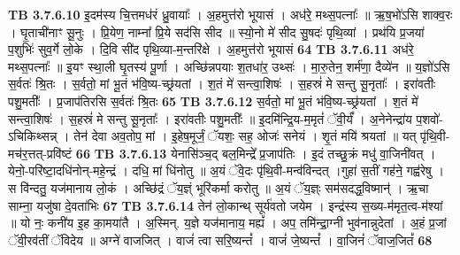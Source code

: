 \documentclass[17pt]{extarticle}
\begin{document}
{{{{{{{{{{{{{{{{{{{                  \newline
                                \textbf{ TB 3.7.6.10} \newline
                  इ॒दम॑स्य चि॒त्तमध॑रं ध्रु॒वायाः᳚ । अ॒हमुत्त॑रो भूयासं । अध॑रे॒ मथ्स॒पत्नाः᳚ ॥ ऋ॒ष॒भो॑ऽसि शाक्व॒रः । घृ॒ताची॑नाꣳ सू॒नुः । प्रि॒येण॒ नाम्ना᳚ प्रि॒ये सद॑सि सीद ॥ स्यो॒नो मे॑ सीद सु॒षदः॑ पृथि॒व्यां । प्रथ॑यि प्र॒जया॑ प॒शुभिः॑ सुव॒र्गे लो॒के । दि॒वि सी॑द पृथि॒व्या-म॒न्तरि॑क्षे । अ॒हमुत्त॑रो भूयासं \textbf{ 64} \newline
                  \newline
                                \textbf{ TB 3.7.6.11} \newline
                  अध॑रे॒ मथ्स॒पत्नाः᳚ ॥ इ॒यꣳ स्था॒ली घृ॒तस्य॑ पू॒र्णा । अच्छि॑न्नपयाः श॒तधा॑र॒ उथ्सः॑ । मा॒रु॒तेन॒ शर्म॑णा॒ दैव्ये॑न ॥ य॒ज्ञो॑ऽसि स॒र्वतः॑ श्रि॒तः । स॒र्वतो॒ मां भू॒तं भ॑वि॒ष्य-च्छ्र॑यतां । श॒तं मे॑ सन्त्वा॒शिषः॑ । स॒हस्रं॑ मे सन्तु सू॒नृताः᳚ । इरा॑वतीः पशु॒मतीः᳚ । प्र॒जाप॑तिरसि स॒र्वतः॑ श्रि॒तः \textbf{ 65} \newline
                  \newline
                                \textbf{ TB 3.7.6.12} \newline
                  स॒र्वतो॒ मां भू॒तं भ॑वि॒ष्य-च्छ्र॑यतां । श॒तं मे॑ सन्त्वा॒शिषः॑ । स॒हस्रं॑ मे सन्तु सू॒नृताः᳚ । इरा॑वतीः पशु॒मतीः᳚ ॥ इ॒दमि॑न्द्रि॒य-म॒मृतं॑ ॅवी॒र्यं᳚ । अ॒नेनेन्द्रा॑य प॒शवो॑-ऽचिकिथ्सन्न् । तेन॑ देवा अव॒तोप॒ मां । इ॒हेष॒मूर्जं॒ ॅयशः॒ सह॒ ओजः॑ सनेयं । शृ॒तं मयि॑ श्रयतां ॥ यत् पृ॑थि॒वी-मच॑र॒त्तत्-प्रवि॑ष्टं \textbf{ 66} \newline
                  \newline
                                \textbf{ TB 3.7.6.13} \newline
                  येनासि॑ञ्च॒द् बल॒मिन्द्रे᳚ प्र॒जाप॑तिः । इ॒दं तच्छु॒क्रं मधु॑ वा॒जिनी॑वत् । येनो॒-परि॑ष्टा॒दधि॑नोन्-महे॒न्द्रं । दधि॒ मां धि॑नोतु ॥ अ॒यं ॅवे॒दः पृ॑थि॒वी-मन्व॑विन्दत् ।गुहा॑ स॒तीं गह॑ने॒ गह्व॑रेषु । स वि॑न्दतु॒ यज॑मानाय लो॒कं । अच्छि॑द्रं ॅय॒ज्ञ्ं भूरि॑कर्मा करोतु ॥ अ॒यं ॅय॒ज्ञ्ः सम॑सदद्ध॒विष्मान्॑ । ऋ॒चा साम्ना॒ यजु॑षा दे॒वता॑भिः \textbf{ 67} \newline
                  \newline
                                \textbf{ TB 3.7.6.14} \newline
                  तेन॑ लो॒कान्थ् सूर्य॑वतो जयेम । इन्द्र॑स्य स॒ख्य-म॑मृत॒त्व-म॑श्यां ॥ यो नः॒ कनी॑य इ॒ह का॒मया॑तै । अ॒स्मिन्. य॒ज्ञे यज॑मानाय॒ मह्यं᳚ । अप॒ तमि॑न्द्रा॒ग्नी भुव॑नान्नुदेतां । अ॒हं प्र॒जां ॅवी॒रव॑तीं ॅविदेय ॥ अग्ने॑ वाजजित् । वाजं॑ त्वा सरि॒ष्यन्तं᳚ । वाजं॑ जे॒ष्यन्तं᳚ । वा॒जिनं॑ ॅवाज॒जितं᳚ \textbf{ 68} \newline
}}}}}}}}}}}}}}}}}}}
\end{document}
